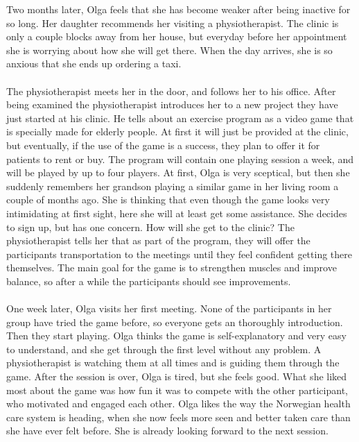 Two months later, Olga feels that she has become weaker after being inactive for so long. Her daughter recommends her visiting a physiotherapist. The clinic is only a couple blocks away from her house, but everyday before her appointment she is worrying about how she will get there. When the day arrives, she is so anxious that she ends up ordering a taxi. \\ \\
The physiotherapist meets her in the door, and follows her to his office. After being examined the physiotherapist introduces her to a new project they have just started at his clinic. He tells about an exercise program as a video game that is specially made for elderly people. At first it will just be provided at the clinic, but eventually, if the use of the game is a success, they plan to offer it for patients to rent or buy. The program will contain one playing session a week, and will be played by up to four players. At first, Olga is very sceptical, but then she suddenly remembers her grandson playing a similar game in her living room a couple of months ago. She is thinking that even though the game looks very intimidating at first sight, here she will at least get some assistance. She decides to sign up, but has one concern. How will she get to the clinic? The physiotherapist tells her that as part of the program, they will offer the participants transportation to the meetings until they feel confident getting there themselves. The main goal for the game is to strengthen muscles and improve balance, so after a while the participants should see improvements. \\ \\
One week later, Olga visits her first meeting. None of the participants in her group have tried the game before, so everyone gets an thoroughly introduction. Then they start playing. Olga thinks the game is self-explanatory and very easy to understand, and she get through the first level without any problem. A physiotherapist is watching them at all times and is guiding them through the game. After the session is over, Olga is tired, but she feels good. What she liked most about the game was how fun it was to compete with the other participant, who motivated and engaged each other. Olga likes the way the Norwegian health care system is heading, when she now feels more seen and better taken care than she have ever felt before. She is already looking forward to the next session.

